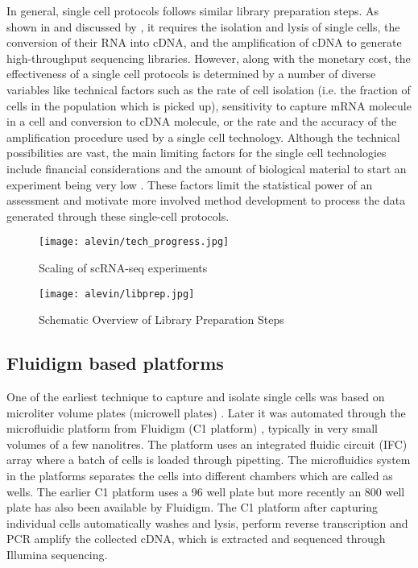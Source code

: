 In general, single cell protocols follows similar library preparation steps. As shown in  and discussed by \citep{ziegenhain2017comparative}, it requires the isolation and lysis of single cells, the conversion of their RNA into cDNA, and the amplification of cDNA to generate high-throughput sequencing libraries. However, along with the monetary cost, the effectiveness of a single cell protocols is determined by a number of diverse variables like technical factors such as the rate of cell isolation (i.e. the fraction of cells in the population which is picked up), sensitivity to capture mRNA molecule in a cell and conversion to cDNA molecule, or the rate and the accuracy of the amplification procedure used by a single cell technology. Although the technical possibilities are vast, the main limiting factors for the single cell technologies include financial considerations and the amount of biological material to start an experiment being very low \citep{vieth2017powsimr, ziegenhain2017comparative}. These factors limit the statistical power of an assessment and motivate more involved method development to process the data generated through these single-cell protocols.



\begin{figure*}
 \centering
 \texttt{[image: alevin/tech\_progress.jpg]}
  \caption{Scaling of scRNA-seq experiments \citep{svensson2018exponential}}
  \label{fig:sc-techs}
\end{figure*}

\begin{figure*}
 \centering
 \texttt{[image: alevin/libprep.jpg]}
  \caption{Schematic Overview of Library Preparation Steps \citep{ziegenhain2017comparative}}
  \label{fig:libprep}
\end{figure*}

\subsection{Fluidigm based platforms ~\citep{islam2012highly, hashimshony2012cel}}
\label{intro:fluidigm}

One of the earliest technique to capture and isolate single cells was based on microliter volume plates (microwell plates) \citep{islam2012highly, hashimshony2012cel}. Later it was automated through the microfluidic platform from Fluidigm (C1 platform) \citep{islam2014}, typically in very small volumes of a few nanolitres. The platform uses an integrated fluidic circuit (IFC) array where a batch of cells is loaded through pipetting. The microfluidics system in the platforms separates the cells into different chambers which are called as wells. The earlier C1 platform uses a 96 well plate but more recently an 800 well plate has also been available by Fluidigm. The C1 platform after capturing individual cells automatically washes and lysis, perform reverse transcription and PCR amplify the collected cDNA, which is extracted and sequenced through Illumina sequencing.

